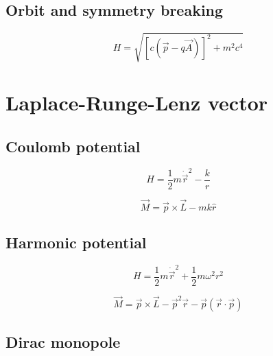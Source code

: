 \documentclass[titlepage]{article}
\begin{document}
\subsection{Orbit and symmetry breaking}

$$H=\sqrt{[c(\vec{p}-q\vec{A})]^2+m^2c^4}$$

\section{Laplace-Runge-Lenz vector}
\subsection{Coulomb potential}

$$H=\frac{1}{2}m\dot{\vec{r}}^2-\frac{k}{r}$$

$$\vec{M}=\vec{p} \times \vec{L}-mk \hat{r}$$

\subsection{Harmonic potential}

$$H=\frac{1}{2}m\dot{\vec{r}}^2+\frac{1}{2}m\omega^2r^2$$

$$\vec{M} = \vec{p} \times \vec{L} - \vec{p}^2 \vec{r} - \vec{p}(\vec{r}\cdot \vec{p})$$

\subsection{Dirac monopole}
\end{document}

